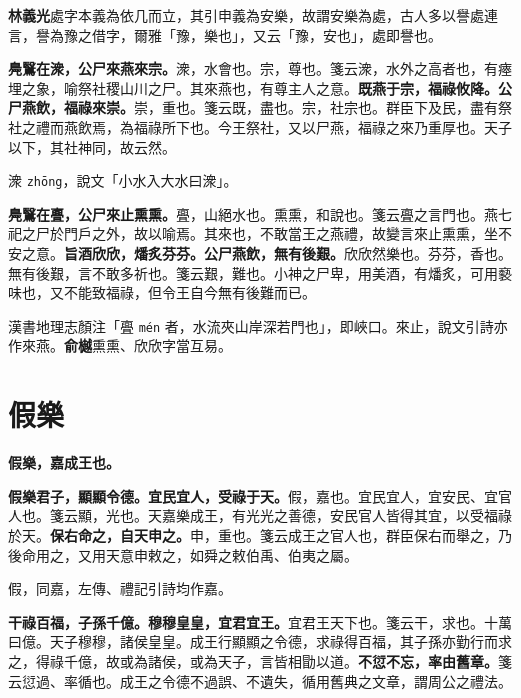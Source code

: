 \begin{quoting}\textbf{林義光}處字本義為依几而立，其引申義為安樂，故謂安樂為處，古人多以譽處連言，譽為豫之借字，爾雅「豫，樂也」，又云「豫，安也」，處即譽也。\end{quoting}

\textbf{鳧鷖在潨，公尸來燕來宗。}{\footnotesize 潨，水會也。宗，尊也。箋云潨，水外之高者也，有瘞埋之象，喻祭社稷山川之尸。其來燕也，有尊主人之意。}\textbf{既燕于宗，福祿攸降。公尸燕飲，福祿來崇。}{\footnotesize 崇，重也。箋云既，盡也。宗，社宗也。群臣下及民，盡有祭社之禮而燕飲焉，為福祿所下也。今王祭社，又以尸燕，福祿之來乃重厚也。天子以下，其社神同，故云然。}

\begin{quoting}潨 \texttt{zhōng}，說文「小水入大水曰潨」。\end{quoting}

\textbf{鳧鷖在亹，公尸來止熏熏。}{\footnotesize 亹，山絕水也。熏熏，和說也。箋云亹之言門也。燕七祀之尸於門戶之外，故以喻焉。其來也，不敢當王之燕禮，故變言來止熏熏，坐不安之意。}\textbf{旨酒欣欣，燔炙芬芬。公尸燕飲，無有後艱。}{\footnotesize 欣欣然樂也。芬芬，香也。無有後艱，言不敢多祈也。箋云艱，難也。小神之尸卑，用美酒，有燔炙，可用褻味也，又不能致福祿，但令王自今無有後難而已。}

\begin{quoting}漢書地理志顏注「亹 \texttt{mén} 者，水流夾山岸深若門也」，即峽口。來止，說文引詩亦作來燕。\textbf{俞樾}熏熏、欣欣字當互易。\end{quoting}

\section{假樂}


\textbf{假樂，嘉成王也。}

\textbf{假樂君子，顯顯令德。宜民宜人，受祿于天。}{\footnotesize 假，嘉也。宜民宜人，宜安民、宜官人也。箋云顯，光也。天嘉樂成王，有光光之善德，安民官人皆得其宜，以受福祿於天。}\textbf{保右命之，自天申之。}{\footnotesize 申，重也。箋云成王之官人也，群臣保右而舉之，乃後命用之，又用天意申敕之，如舜之敕伯禹、伯夷之屬。}

\begin{quoting}假，同嘉，左傳、禮記引詩均作嘉。\end{quoting}

\textbf{干祿百福，子孫千億。穆穆皇皇，宜君宜王。}{\footnotesize 宜君王天下也。箋云干，求也。十萬曰億。天子穆穆，諸侯皇皇。成王行顯顯之令德，求祿得百福，其子孫亦勤行而求之，得祿千億，故或為諸侯，或為天子，言皆相勖以道。}\textbf{不愆不忘，率由舊章。}{\footnotesize 箋云愆過、率循也。成王之令德不過誤、不遺失，循用舊典之文章，謂周公之禮法。}

